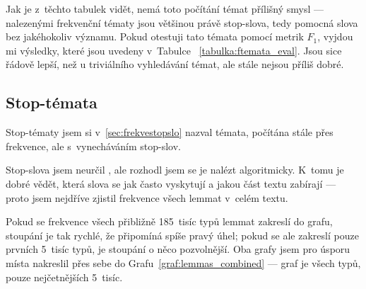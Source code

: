 \documentclass[12pt,a4paper]{report}
\begin{document}
Jak je z~těchto tabulek vidět, nemá toto počítání témat přílišný smysl --- nalezenými frekvenční tématy jsou většinou právě stop-slova, tedy pomocná slova bez jakéhokoliv významu. 
Pokud otestuji tato témata pomocí metrik $F_1$, vyjdou mi výsledky, které jsou uvedeny v~Tabulce ~\ref{tabulka:ftemata_eval}. Jsou si\-ce řá\-do\-vě lep\-ší, než u tri\-vi\-á\-lní\-ho vy\-hle\-dá\-vá\-ní témat, ale stále nejsou příliš dobré.



\subsection{Stop-témata}
\label{sec:stemata}




Stop-tématy jsem si v~\ref{sec:frekvestopslo} nazval témata, počítána stále  přes frekvence, ale s~vynecháváním stop-slov.

Stop-slova jsem neurčil , ale rozhodl jsem se je nalézt algoritmicky. K~tomu je dobré vědět, která slova se jak často vyskytují a jakou část textu zabírají --- proto jsem nejdříve zjistil frekvence všech lemmat v~celém textu. 

Pokud se frekvence všech přibližně 185~tisíc typů lemmat zakreslí do grafu, stoupání je tak rychlé, že připomíná spíše pravý úhel; pokud se ale zakreslí pouze prvních 5~tisíc typů, je stoupání o něco pozvolnější. Oba grafy jsem pro úsporu místa nakreslil přes sebe do Grafu~\ref{graf:lemmas_combined} ---  graf je všech typů,  pouze nejčetnějších 5~tisíc.
\end{document}
